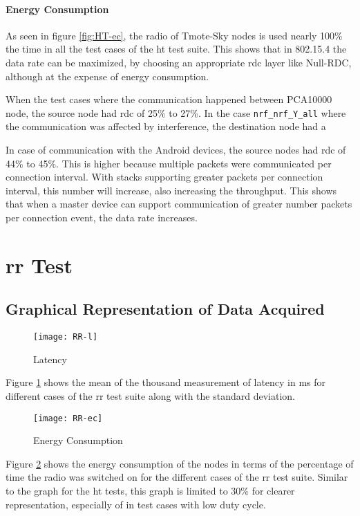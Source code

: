\paragraph{Energy Consumption}
As seen in figure \ref{fig:HT-ec}, the radio of Tmote-Sky nodes is used nearly 100\% the time in all the test cases of the \gls{ht} test suite. This shows that in 802.15.4 the data rate can be maximized, by choosing an appropriate \gls{rdc} layer like Null-RDC, although at the expense of energy consumption. 

When the test cases where the communication happened between PCA10000 node, the source node had \gls{rdc} of 25\% to 27\%. In the case \texttt{nrf\_nrf\_Y\_all} where the communication was affected by interference, the destination node had a 

In case of communication with the Android devices, the source nodes had \gls{rdc} of 44\% to 45\%. This is higher because multiple packets were communicated per connection interval. With stacks supporting greater packets per connection interval, this number will increase, also increasing the throughput. This shows that when a master device can support communication of greater number packets per connection event, the data rate increases.

\section{\acrlong{rr} Test}

\subsection{Graphical Representation of Data Acquired}
\begin{figure}[h]
\texttt{[image: RR-l]}
\caption{Latency}
\label{fig:RR-l}
\end{figure}

Figure \ref{fig:RR-l} shows the mean of the thousand measurement of latency in ms for different cases of the \gls{rr} test suite along with the standard deviation. 

\begin{figure}[h]
\texttt{[image: RR-ec]}
\caption{Energy Consumption}
\label{fig:RR-ec}
\end{figure}

Figure \ref{fig:RR-ec} shows the energy consumption of the nodes in terms of the percentage of time the radio was switched on for the different cases of the \gls{rr} test suite. Similar to the graph for the \gls{ht} tests, this graph is limited to 30\% for clearer representation, especially of in test cases with low duty cycle.

